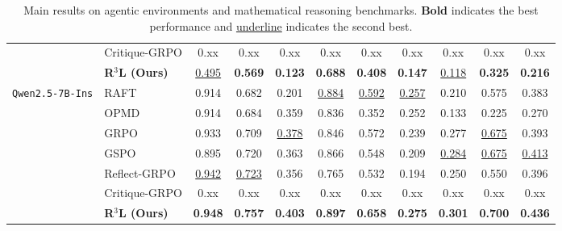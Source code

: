 \begin{table}[t]
{\begin{tabular}{ll ccc cccccc}
& Critique-GRPO & 0.xx & 0.xx & 0.xx & 0.xx & 0.xx & 0.xx & 0.xx & 0.xx & 0.xx \\
\rowcolor{cyan!10} & \textbf{R$^3$L (Ours)} & \underline{0.495} & \textbf{0.569} & \textbf{0.123} & \textbf{0.688} & \textbf{0.408} & \textbf{0.147} & \underline{0.118} & \textbf{0.325} & \textbf{0.216} \\
\midrule
\multirow{7}{*}{\texttt{Qwen2.5-7B-Ins}}
& RAFT & 0.914 & 0.682 & 0.201 & \underline{0.884} & \underline{0.592} & \underline{0.257} & 0.210 & 0.575 & 0.383 \\
& OPMD & 0.914 & 0.684 & 0.359 & 0.836 & 0.352 & 0.252 & 0.133 & 0.225 & 0.270 \\
& GRPO & 0.933 & 0.709 & \underline{0.378} & 0.846 & 0.572 & 0.239 & 0.277 & \underline{0.675} & 0.393 \\
& GSPO & 0.895 & 0.720 & 0.363 & 0.866 & 0.548 & 0.209 & \underline{0.284} & \underline{0.675} & \underline{0.413} \\
& Reflect-GRPO & \underline{0.942} & \underline{0.723} & 0.356 & 0.765 & 0.532 & 0.194 & 0.250 & 0.550 & 0.396 \\
& Critique-GRPO & 0.xx & 0.xx & 0.xx & 0.xx & 0.xx & 0.xx & 0.xx & 0.xx & 0.xx \\
\rowcolor{cyan!10} & \textbf{R$^3$L (Ours)} & \textbf{0.948} & \textbf{0.757} & \textbf{0.403} & \textbf{0.897} & \textbf{0.658} & \textbf{0.275} & \textbf{0.301} & \textbf{0.700} & \textbf{0.436} \\
\bottomrule
\end{tabular}
} %
\caption{Main results on agentic environments and mathematical reasoning benchmarks. \textbf{Bold} indicates the best performance and \underline{underline} indicates the second best.}
\label{tab:main_results}
\end{table}

